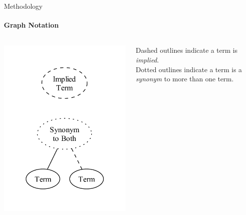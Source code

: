 \documentclass{beamer}
\begin{document}
\begin{frame}[t]{Methodology}
    \framesubtitle{Graph Notation}
    \begin{columns}[T]
        \begin{column}{.5\textwidth}
            \vspace{-0.75cm}
            \centering
            \includegraphics[width=\linewidth]{assets/graphs/manual/catRels8.pdf}
        \end{column}
        \begin{column}{.5\textwidth}
            \vspace{0.75cm}
            Dashed outlines indicate a term is \emph{implied}.\\
            \vspace{2.5cm}
            Dotted outlines indicate a term is a \emph{synonym} to more than one term.
        \end{column}
    \end{columns}
\end{frame}
\end{document}
